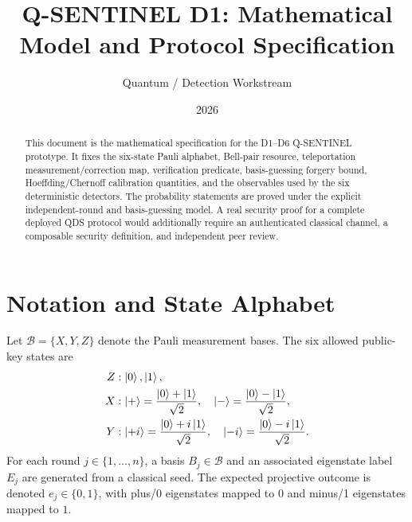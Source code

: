 \documentclass[11pt,a4paper]{article}
\title{Q-SENTINEL D1: Mathematical Model and Protocol Specification}
\author{Quantum / Detection Workstream}
\date{2026}
\begin{document}
\maketitle

\begin{abstract}
This document is the mathematical specification for the D1--D6 Q-SENTINEL
prototype. It fixes the six-state Pauli alphabet, Bell-pair resource,
teleportation measurement/correction map, verification predicate, basis-guessing
forgery bound, Hoeffding/Chernoff calibration quantities, and the observables
used by the six deterministic detectors. The probability statements are
proved under the explicit independent-round and basis-guessing model. A real
security proof for a complete deployed QDS protocol would additionally require
an authenticated classical channel, a composable security definition, and
independent peer review.
\end{abstract}

\section{Notation and State Alphabet}
Let $\mathcal{B}=\{X,Y,Z\}$ denote the Pauli measurement bases. The six allowed
public-key states are
\begin{align*}
Z &: \ket{0},\ket{1},\\
X &: \ket{+}=\frac{\ket{0}+\ket{1}}{\sqrt2},\quad
     \ket{-}=\frac{\ket{0}-\ket{1}}{\sqrt2},\\
Y &: \ket{+i}=\frac{\ket{0}+i\ket{1}}{\sqrt2},\quad
     \ket{-i}=\frac{\ket{0}-i\ket{1}}{\sqrt2}.
\end{align*}
For each round $j\in\{1,\ldots,n\}$, a basis $B_j\in\mathcal B$ and an
associated eigenstate label $E_j$ are generated from a classical seed. The
expected projective outcome is denoted $e_j\in\{0,1\}$, with plus/0 eigenstates
mapped to $0$ and minus/1 eigenstates mapped to $1$.
\end{document}
